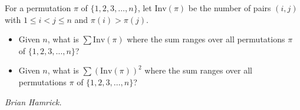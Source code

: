 For a permutation $\pi$ of $\{1,2,3,\ldots,n\}$, let $\text{Inv}(\pi)$ be the number of pairs $(i,j)$ with $1 \leq i < j \leq n$ and $\pi(i) > \pi(j)$.
\begin{itemize}
	\item Given $n$, what is $\sum \text{Inv}(\pi)$ where the sum ranges over all permutations $\pi$ of $\{1,2,3,\ldots,n\}$?
	\item Given $n$, what is $\sum \left(\text{Inv}(\pi)\right)^2$ where the sum ranges over all permutations $\pi$ of $\{1,2,3,\ldots,n\}$?
\end{itemize}

\textit{Brian Hamrick.}